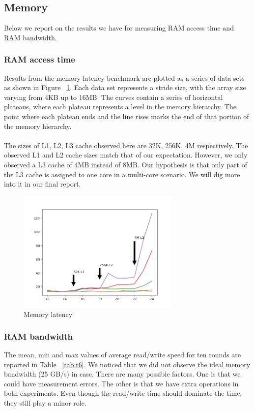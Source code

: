 \subsection{Memory}
Below we report on the results we have for measuring RAM access time and RAM bandwidth.

\subsubsection{RAM access time}
Results from the memory latency benchmark are
plotted as a series of data sets as shown in Figure ~\ref{fig:f1}.
Each data set represents a stride size, with the array
size varying from 4KB up to 16MB. The
curves contain a series of horizontal plateaus, where
each plateau represents a level in the memory hierarchy. The point where each plateau ends and the line
rises marks the end of that portion of the memory hierarchy.\\
\\
The sizes of L1, L2, L3 cache observed here are 32K, 256K, 4M respectively.
The observed L1 and L2 cache sizes match that of our expectation.
However, we only observed a L3 cache of 4MB instead of 8MB.
Our hypothesis is that
only part of the L3 cache is assigned to one core in a multi-core scenario.
We will dig more into it in our final report.

\begin{figure}[htb]
    \includegraphics[width=8cm]{fig1_latency.png}
    \centering
    \caption{Memory latency}
    \label{fig:f1}
\end{figure}

\subsubsection{RAM bandwidth}
The mean, min and max values of average read/write speed for ten rounds are reported in Table ~\ref{tab:t6}. 
We noticed that we did not observe the ideal memory bandwidth (25 GB/s) in case.
There are many possible factors. 
One is that we could have measurement errors. 
The other is that we have extra operations in both experiments.
Even though the read/write time should dominate the time,
they still play a minor role.

